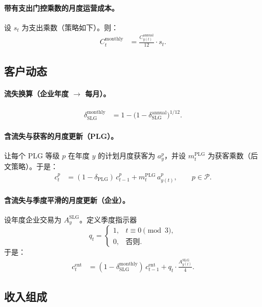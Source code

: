 \documentclass[11pt, a4paper, oneside]{article}
\begin{document}
\paragraph{带有支出门控乘数的月度运营成本。}
设 $s_t$ 为支出乘数（策略如下）。则：
\begin{align}
C^{\mathrm{monthly}}_t 
  &= \frac{C^{\mathrm{annual}}_{y(t)}}{12} \cdot s_t.
\end{align}

\subsection{客户动态}
\paragraph{流失换算（企业年度 $\to$ 每月）。}
\begin{align}
\delta^{\mathrm{monthly}}_{\mathrm{SLG}} 
  &= 1 - \bigl(1 - \delta^{\mathrm{annual}}_{\mathrm{SLG}}\bigr)^{1/12}.
\end{align}

\paragraph{含流失与获客的月度更新（PLG）。}
让每个 PLG 等级 $p$ 在年度 $y$ 的计划月度获客为 $a^p_y$，并设 $m^{\mathrm{PLG}}_t$ 为获客乘数（后文策略）。于是：
\begin{align}
c^p_t 
  &= (1-\delta_{\mathrm{PLG}})\, c^p_{t-1} + m^{\mathrm{PLG}}_t \, a^p_{y(t)}, 
  \qquad p \in \mathcal{P}.
\end{align}

\paragraph{含流失与季度平滑的月度更新（企业）。}
设年度企业交易为 $A^{\mathrm{SLG}}_{y}$。定义季度指示器
\[
q_t = 
\begin{cases}
1, & t \equiv 0 \pmod{3},\\
0, & \text{否则}.
\end{cases}
\]
于是：
\begin{align}
c^{\mathrm{ent}}_t 
  &= (1-\delta^{\mathrm{monthly}}_{\mathrm{SLG}})\, c^{\mathrm{ent}}_{t-1}
     + q_t \cdot \frac{A^{\mathrm{SLG}}_{y(t)}}{4}.
\end{align}

\subsection{收入组成}
\end{document}
